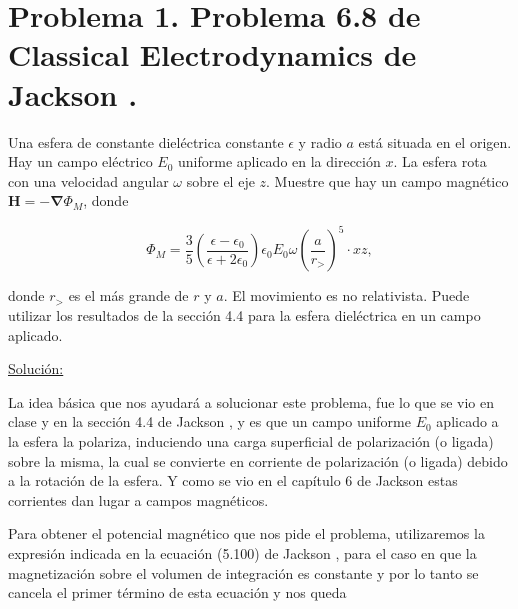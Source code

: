 \documentclass[a4paper,11pt]{article}
\numberwithin{equation}{section}
\renewcommand{\thefootnote}{\fnsymbol{footnote}}
\begin{document}
\fancyhead[R]{\thepage}

\setcounter{footnote}{0}
\renewcommand*{\thefootnote}{\arabic{footnote}}


\section{Problema 1. Problema 6.8 de Classical Electrodynamics
de Jackson \cite{jackson}.}

Una esfera de constante dieléctrica constante $\epsilon$ y radio $a$ está situada 
en el origen. Hay un campo eléctrico $E_0$ uniforme aplicado en la dirección $x$. 
La esfera rota con una velocidad angular $\omega$ sobre el eje $z$. Muestre que 
hay un campo magnético $\mathbf{H} = - \mathbf{\nabla} \Phi_M$, donde 

$$
\Phi_M = \frac{3}{5}\left(\frac{\epsilon - \epsilon_0}{\epsilon + 2\epsilon_0}\right)
\epsilon_0E_0\omega\left(\frac{a}{r_>}\right)^5\cdot xz,
$$

donde $r_>$ es el más grande de $r$ y $a$. El movimiento es no relativista. Puede 
utilizar los resultados de la sección 4.4 para la esfera dieléctrica en un campo 
aplicado.

\vspace{.3cm}

\underline{Solución:} \vspace{.3cm}

La idea básica que nos ayudará a solucionar este problema, fue lo que se vio en 
clase y en la sección 4.4 de Jackson \cite{jackson}, y es que un campo uniforme
$E_0$ aplicado a la esfera la polariza, induciendo una carga superficial de 
polarización (o ligada) sobre la misma, la cual se convierte en corriente de 
polarización (o ligada) debido a la rotación de la esfera. Y como se vio en el 
capítulo 6 de Jackson \cite{jackson} estas corrientes dan lugar a campos 
magnéticos.

\vspace{.3cm}

Para obtener el potencial magnético que nos pide el problema, utilizaremos la expresión 
indicada en la ecuación (5.100) de Jackson \cite{jackson}, para el caso en que 
la magnetización sobre el volumen de integración es constante y por lo tanto 
se cancela el primer término de esta ecuación y nos queda 
\end{document}
